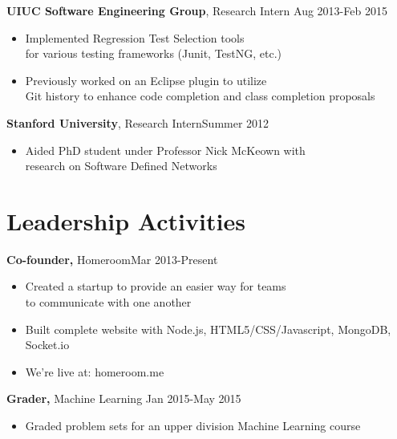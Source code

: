 \documentclass[margin]{res}
\begin{document}
\begin{resume}
                  \parskip 2pt                  
                  {\bf UIUC Software Engineering Group}, Research Intern \hfill Aug 2013-Feb 2015
                  \begin{itemize} \itemsep -3pt  %
                  \item Implemented Regression Test Selection tools \\for various testing frameworks (Junit, TestNG, etc.)
                  \item Previously worked on an Eclipse plugin to utilize \\Git history to enhance code completion and class completion proposals
                  \end{itemize}
                  
                  {\bf Stanford University}, Research Intern\hfill  Summer 2012
                  \begin{itemize} \itemsep -3pt %
                  \item Aided PhD student under Professor Nick McKeown with\\ research on Software Defined Networks 
                  \end{itemize}


                  \section{Leadership   Activities} 
                          {\bf Co-founder,} Homeroom\hfill Mar 2013-Present \parskip -2pt
                          \begin{itemize} \itemsep -3pt
                          \item Created a startup to provide an easier way for teams\\ to communicate with one another
                          \item  Built complete website with Node.js, HTML5/CSS/Javascript, MongoDB, Socket.io
                          \item We're live at: homeroom.me \smallskip
		          \end{itemize}
                          
	                  {\bf Grader, } Machine Learning \hfill Jan 2015-May 2015
                          \begin{itemize} \itemsep -3pt
                          \item
                            Graded problem sets for an upper division Machine Learning course \smallskip
                          \end{itemize}
                          

\end{resume}
\end{document}
